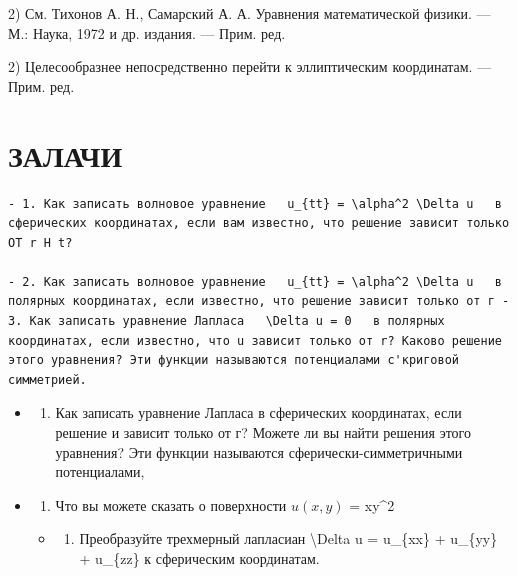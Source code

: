 \documentclass[
]{article}
\providecommand{\tightlist}{%
  \setlength{\itemsep}{0pt}\setlength{\parskip}{0pt}}
\begin{document}
2) См. Тихонов А. Н., Самарский А. А. Уравнения математической физики.
--- М.: Наука, 1972 и др. издания. --- Прим. ред.

2) Целесообразнее непосредственно перейти к эллиптическим координатам.
--- Прим. ред.

\section{ЗАЛАЧИ}\label{ux437ux430ux43bux430ux447ux438}

\begin{verbatim}
- 1. Как записать волновое уравнение   u_{tt} = \alpha^2 \Delta u   в сферических координатах, если вам известно, что решение зависит только OT r H t?

- 2. Как записать волновое уравнение   u_{tt} = \alpha^2 \Delta u   в полярных координатах, если известно, что решение зависит только от г - 3. Как записать уравнение Лапласа   \Delta u = 0   в полярных координатах, если известно, что u зависит только от r? Каково решение этого уравнения? Эти функции называются потенциалами с'криговой симметрией.
\end{verbatim}

\begin{itemize}
\item
  \begin{enumerate}
  \def\labelenumi{\arabic{enumi}.}
  \setcounter{enumi}{3}
  \tightlist
  \item
    Как записать уравнение Лапласа в сферических координатах, если
    решение и зависит только от г? Можете ли вы найти решения этого
    уравнения? Эти функции называются сферически-симметричными
    потенциалами,
  \end{enumerate}
\item
  \begin{enumerate}
  \def\labelenumi{\arabic{enumi}.}
  \setcounter{enumi}{4}
  \tightlist
  \item
    Что вы можете сказать о поверхности \(u(x, y)\) = xy\^{}2
  \end{enumerate}

  \begin{itemize}
  \tightlist
  \item
    \begin{enumerate}
    \def\labelenumi{\arabic{enumi}.}
    \setcounter{enumi}{5}
    \tightlist
    \item
      Преобразуйте трехмерный лапласиан \textbackslash Delta u =
      u\_\{xx\} + u\_\{yy\} + u\_\{zz\} к сферическим координатам.
    \end{enumerate}
  \end{itemize}
\end{itemize}
\end{document}
